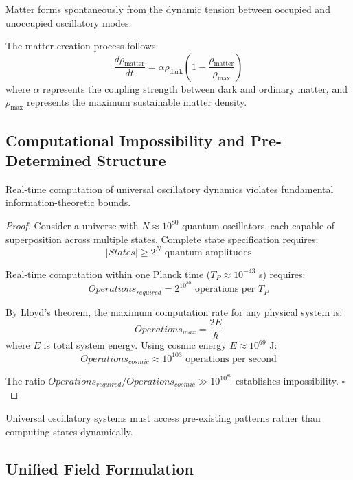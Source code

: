 \documentclass[11pt,a4paper]{article}
\begin{document}
\begin{theorem}
Matter forms spontaneously from the dynamic tension between occupied and unoccupied oscillatory modes.
\end{theorem}

The matter creation process follows:
$$\frac{d\rho_{\text{matter}}}{dt} = \alpha \rho_{\text{dark}} \left(1 - \frac{\rho_{\text{matter}}}{\rho_{\text{max}}}\right)$$
where $\alpha$ represents the coupling strength between dark and ordinary matter, and $\rho_{\text{max}}$ represents the maximum sustainable matter density.

\subsection{Computational Impossibility and Pre-Determined Structure}

\begin{theorem}
Real-time computation of universal oscillatory dynamics violates fundamental information-theoretic bounds.
\end{theorem}

\begin{proof}
Consider a universe with $N \approx 10^{80}$ quantum oscillators, each capable of superposition across multiple states. Complete state specification requires:
$$|States| \geq 2^N \text{ quantum amplitudes}$$

Real-time computation within one Planck time ($T_P \approx 10^{-43}$ s) requires:
$$Operations_{required} = 2^{10^{80}} \text{ operations per } T_P$$

By Lloyd's theorem, the maximum computation rate for any physical system is:
$$Operations_{max} = \frac{2E}{\hbar}$$
where $E$ is total system energy. Using cosmic energy $E \approx 10^{69}$ J:
$$Operations_{cosmic} \approx 10^{103} \text{ operations per second}$$

The ratio $Operations_{required}/Operations_{cosmic} \gg 10^{10^{80}}$ establishes impossibility. $\square$
\end{proof}

\begin{corollary}
Universal oscillatory systems must access pre-existing patterns rather than computing states dynamically.
\end{corollary}

\subsection{Unified Field Formulation}
\end{document}
